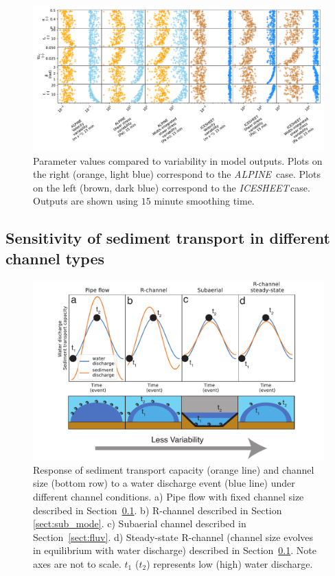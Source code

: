 \documentclass[tc, manuscript]{copernicus}
\newcommand{\alpine}{\textit{ALPINE}\,}
\newcommand{\icesheet}{\textit{ICESHEET}\,}
\begin{document}
\begin{figure}[hbt!]
  \centering
  \includegraphics[width=0.7\linewidth]{Fig4.pdf}
  \caption{Parameter values compared to variability in model outputs.
    Plots on the right (orange, light blue) correspond to the \alpine{} case. Plots on the left (brown, dark blue) correspond to the \icesheet case.
    Outputs are shown using $15$ minute smoothing time. 
  }
  \label{fig:params}
\end{figure}

\FloatBarrier
\subsection{Sensitivity of sediment transport in different channel types}
\label{sect:scaling}

\begin{figure}[hbt!]
  \centering
  \includegraphics[width=0.7\linewidth]{Fig7.pdf}
  \caption{Response of sediment transport capacity (orange line) and channel size (bottom row) to a water discharge event (blue line) under different channel conditions.
    a) Pipe flow with fixed channel size described in Section~\ref{sect:scaling}.
    b) R-channel described in Section \ref{sect:sub_mode}.
    c) Subaerial channel described in Section~\ref{sect:fluv}.
    d) Steady-state R-channel (channel size evolves in equilibrium with water discharge) described in Section~\ref{sect:scaling}.
    Note axes are not to scale.
    $t_1$ ($t_2$) represents low (high) water discharge. 
  }
  \label{fig:chan_types}
\end{figure}
\end{document}

